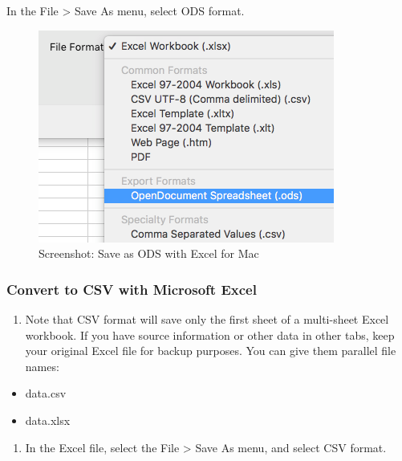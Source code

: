 \documentclass[
  english,
]{book}
\providecommand{\tightlist}{%
  \setlength{\itemsep}{0pt}\setlength{\parskip}{0pt}}
\begin{document}
In the File \textgreater{} Save As menu, select ODS format.

\begin{figure}
\centering
\includegraphics{images/02-spreadsheet/excel-save-as-ods.png}
\caption{Screenshot: Save as ODS with Excel for Mac}
\end{figure}

\hypertarget{convert-to-csv-with-microsoft-excel}{%
\subsubsection*{Convert to CSV with Microsoft Excel}\label{convert-to-csv-with-microsoft-excel}}

\begin{enumerate}
\def\labelenumi{\arabic{enumi})}
\tightlist
\item
  Note that CSV format will save only the first sheet of a multi-sheet Excel workbook. If you have source information or other data in other tabs, keep your original Excel file for backup purposes. You can give them parallel file names:
\end{enumerate}

\begin{itemize}
\tightlist
\item
  data.csv
\item
  data.xlsx
\end{itemize}

\begin{enumerate}
\def\labelenumi{\arabic{enumi})}
\setcounter{enumi}{1}
\tightlist
\item
  In the Excel file, select the File \textgreater{} Save As menu, and select CSV format.
\end{enumerate}
\end{document}

